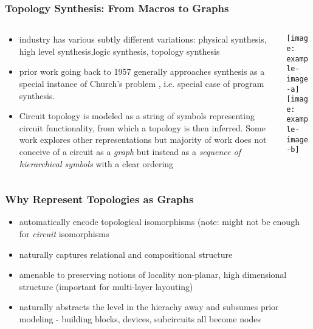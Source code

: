 \documentclass[./presentation.tex]{subfiles}
\begin{document}
\begin{frame}[label=working]
\frametitle{Topology Synthesis: From Macros to Graphs}
\begin{columns}
  \begin{column}{0.5\textwidth}
  {\tiny
      \begin{itemize}
        \item industry has various subtly different variations: physical synthesis, high level synthesis,logic synthesis, topology synthesis\\
        \item prior work going back to 1957 generally approaches synthesis as a special instance of Church's problem \cite{churchApplicationRecursiveArithmetic1963}, i.e. special case of program synthesis.
       \item Circuit topology is modeled as a string of symbols representing circuit functionality, from which a topology is then inferred. Some work explores other representations \citep{rojecAnalogCircuitTopology2018} but majority of work \citep{fanSpecificationTopologyAutomatic2021f,zhaoAutomatedTopologySynthesis2022a,fayaziAnGeLFullyAutomatedAnalog2023a,dasilvaAutoTGReinforcementLearningBased2023} does not conceive of a circuit as a \emph{graph} but instead as a \emph{sequence of hierarchical symbols} with a clear ordering
     \end{itemize}
   }
  \end{column}%
  \begin{column}{0.5\textwidth}
  \centering
  \texttt{[image: example-image-a]}\\%
  \texttt{[image: example-image-b]}%
  \end{column}
\end{columns}
\end{frame}

\begin{frame}[label=todo]
\frametitle{Why Represent Topologies as Graphs}
\begin{itemize}
  \item automatically encode topological isomorphisms (note: might not be enough for \emph{circuit} isomorphisms \cite{wangFunctionalityMattersNetlist2022c}
  \item naturally captures relational and compositional structure
  \item amenable to preserving notions of locality non-planar, high dimensional structure (important for multi-layer layouting)
  \item naturally abstracts the level in the hierachy away and subsumes prior modeling - building blocks, devices, subcircuits all become nodes
\end{itemize}
\end{frame}
\end{document}
